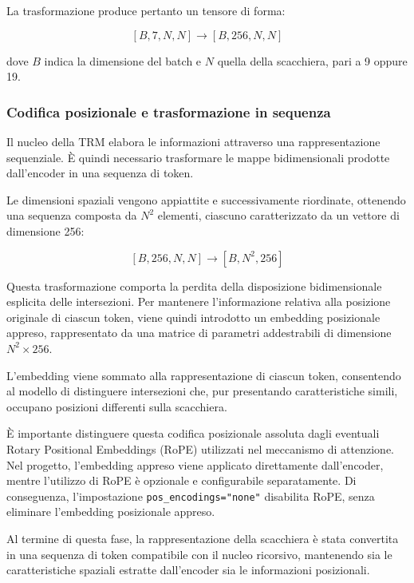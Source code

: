 La trasformazione produce pertanto un tensore di forma:

\[
    [B, 7, N, N]
    \longrightarrow
    [B, 256, N, N]
\]

dove $B$ indica la dimensione del batch e $N$ quella della scacchiera, pari a 9 oppure 19.

\subsubsection{Codifica posizionale e trasformazione in sequenza}

Il nucleo della TRM elabora le informazioni attraverso una rappresentazione sequenziale. È quindi necessario trasformare le mappe bidimensionali prodotte dall'encoder in una sequenza di token.

Le dimensioni spaziali vengono appiattite e successivamente riordinate, ottenendo una sequenza composta da $N^2$ elementi, ciascuno caratterizzato da un vettore di dimensione 256:

\[
    [B, 256, N, N]
    \longrightarrow
    [B, N^2, 256]
\]

Questa trasformazione comporta la perdita della disposizione bidimensionale esplicita delle intersezioni. Per mantenere l'informazione relativa alla posizione originale di ciascun token, viene quindi introdotto un embedding posizionale appreso, rappresentato da una matrice di parametri addestrabili di dimensione $N^2\times256$.

L'embedding viene sommato alla rappresentazione di ciascun token, consentendo al modello di distinguere intersezioni che, pur presentando caratteristiche simili, occupano posizioni differenti sulla scacchiera.

È importante distinguere questa codifica posizionale assoluta dagli eventuali Rotary Positional Embeddings (RoPE) utilizzati nel meccanismo di attenzione. Nel progetto, l'embedding appreso viene applicato direttamente dall'encoder, mentre l'utilizzo di RoPE è opzionale e configurabile separatamente. Di conseguenza, l'impostazione \texttt{pos\_encodings="none"} disabilita RoPE, senza eliminare l'embedding posizionale appreso.

Al termine di questa fase, la rappresentazione della scacchiera è stata convertita in una sequenza di token compatibile con il nucleo ricorsivo, mantenendo sia le caratteristiche spaziali estratte dall'encoder sia le informazioni posizionali.

